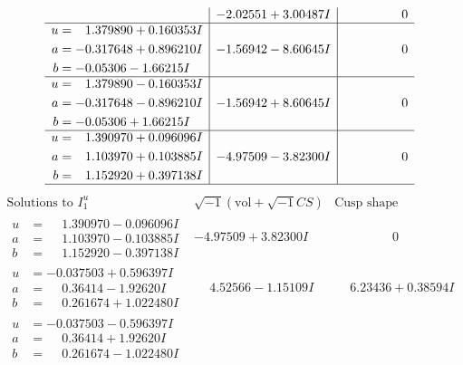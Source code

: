 \documentclass[1p]{elsarticle_modified}
\theoremstyle{definition}
\newcommand{\I}{\sqrt{-1}}
\begin{document}
$$\begin{array}{c|c|c}
 & -2.02551 + 3.00487 I & \phantom{-0.000000 } 0 \\ \hline\begin{aligned}
u &= \phantom{-}1.379890 + 0.160353 I \\
a &= -0.317648 + 0.896210 I \\
b &= -0.05306 - 1.66215 I\end{aligned}
 & -1.56942 - 8.60645 I & \phantom{-0.000000 } 0 \\ \hline\begin{aligned}
u &= \phantom{-}1.379890 - 0.160353 I \\
a &= -0.317648 - 0.896210 I \\
b &= -0.05306 + 1.66215 I\end{aligned}
 & -1.56942 + 8.60645 I & \phantom{-0.000000 } 0 \\ \hline\begin{aligned}
u &= \phantom{-}1.390970 + 0.096096 I \\
a &= \phantom{-}1.103970 + 0.103885 I \\
b &= \phantom{-}1.152920 + 0.397138 I\end{aligned}
 & -4.97509 - 3.82300 I & \phantom{-0.000000 } 0\\
 \hline 
 \end{array}$$\newpage$$\begin{array}{c|c|c}  
\text{Solutions to }I^u_{1}& \I (\text{vol} + \sqrt{-1}CS) & \text{Cusp shape}\\
 \hline 
\begin{aligned}
u &= \phantom{-}1.390970 - 0.096096 I \\
a &= \phantom{-}1.103970 - 0.103885 I \\
b &= \phantom{-}1.152920 - 0.397138 I\end{aligned}
 & -4.97509 + 3.82300 I & \phantom{-0.000000 } 0 \\ \hline\begin{aligned}
u &= -0.037503 + 0.596397 I \\
a &= \phantom{-}0.36414 - 1.92620 I \\
b &= \phantom{-}0.261674 + 1.022480 I\end{aligned}
 & \phantom{-}4.52566 - 1.15109 I & \phantom{-}6.23436 + 0.38594 I \\ \hline\begin{aligned}
u &= -0.037503 - 0.596397 I \\
a &= \phantom{-}0.36414 + 1.92620 I \\
b &= \phantom{-}0.261674 - 1.022480 I\end{aligned}

\end{array}$$
\end{document}
